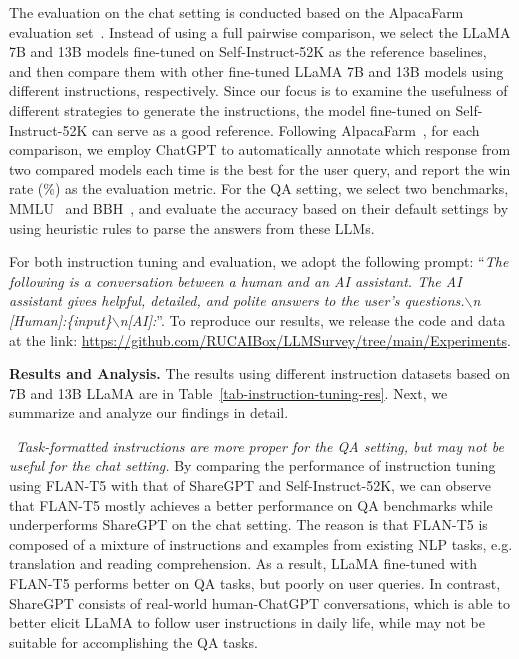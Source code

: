 The evaluation on the chat setting is conducted based on the AlpacaFarm evaluation set~\cite{Dubois-arxiv-2023-AlpacaFarm}. Instead of using a full pairwise comparison, {we select the LLaMA 7B and 13B models fine-tuned on Self-Instruct-52K as the reference baselines, and then compare them with other fine-tuned LLaMA 7B and 13B models using different instructions, respectively.} Since our focus is to examine the usefulness of different strategies to generate the instructions, the model fine-tuned on Self-Instruct-52K can serve as a good reference. Following AlpacaFarm~\cite{Dubois-arxiv-2023-AlpacaFarm}, for each comparison,  we employ ChatGPT to automatically annotate which response from two compared models each time is the best for the user query, and report the win rate (\%) as the evaluation metric. For the QA setting, we select two benchmarks, MMLU~\cite{Hendrycks-ICLR-2021-Measuring} and BBH~\cite{Suzgun-arxiv-2022-Challenging}, and evaluate the accuracy based on their default settings by using heuristic rules to parse the answers from these LLMs.

For both instruction tuning and evaluation, we adopt the following prompt: ``\emph{The following is a conversation between a human and an AI assistant. The AI assistant gives helpful, detailed, and polite answers to the user's questions.$\backslash$n [\textbar Human\textbar]:\{input\}$\backslash$n[\textbar AI\textbar]:}''.
To reproduce our results, we release the  code and data at the link:  \url{https://github.com/RUCAIBox/LLMSurvey/tree/main/Experiments}.

\textbf{Results and Analysis.} The results using different instruction datasets based on 7B and 13B LLaMA are in Table~\ref{tab-instruction-tuning-res}. Next, we summarize and analyze our findings in detail.

\textbullet~\emph{{Task-formatted instructions are more proper for the QA setting, but may not be useful for the chat setting.}} By comparing the performance of instruction tuning using FLAN-T5 with that of ShareGPT and Self-Instruct-52K, we can observe that FLAN-T5 mostly achieves a better performance on QA benchmarks while underperforms ShareGPT on the chat setting. The reason is that FLAN-T5 is composed of a mixture of instructions and examples from existing NLP tasks, e.g. translation and reading comprehension. As a result, LLaMA  fine-tuned with FLAN-T5 performs better on QA tasks, but poorly on user queries. In contrast, ShareGPT consists of real-world human-ChatGPT conversations, which is able to better elicit LLaMA to {follow user instructions} in daily life, while may not be suitable for accomplishing the QA tasks.

